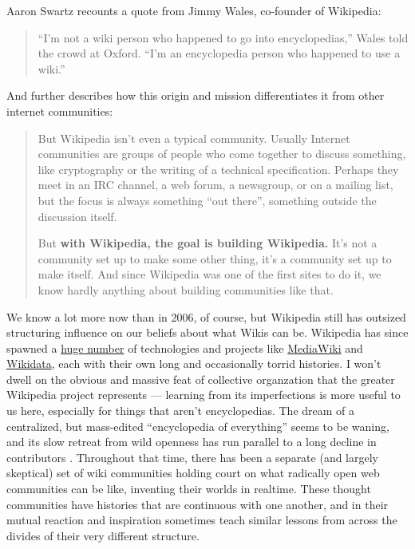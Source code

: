 \documentclass[10pt]{article}
\begin{document}
\begin{multicols}{2}
Aaron Swartz recounts a quote from Jimmy Wales, co-founder of Wikipedia:

\begin{quote}
``I'm not a wiki person who happened to go into encyclopedias,'' Wales
told the crowd at Oxford. ``I'm an encyclopedia person who happened to
use a wiki.'' \cite{swartzWhoWritesWikipedia2006} 
\end{quote}

And further describes how this origin and mission differentiates it from
other internet communities:

\begin{quote}
But Wikipedia isn't even a typical community. Usually Internet
communities are groups of people who come together to discuss something,
like cryptography or the writing of a technical specification. Perhaps
they meet in an IRC channel, a web forum, a newsgroup, or on a mailing
list, but the focus is always something ``out there'', something outside
the discussion itself.

But \textbf{with Wikipedia, the goal is building Wikipedia.} It's not a
community set up to make some other thing, it's a community set up to
make itself. And since Wikipedia was one of the first sites to do it, we
know hardly anything about building communities like that. \cite{swartzMakingMoreWikipedias2006} 
\end{quote}

We know a lot more now than in 2006, of course, but Wikipedia still has
outsized structuring influence on our beliefs about what Wikis can be.
Wikipedia has since spawned a
\href{https://meta.wikimedia.org/wiki/Complete_list_of_Wikimedia_projects}{huge
number} of technologies and projects like
\href{https://meta.wikimedia.org/wiki/MediaWiki}{MediaWiki} and
\href{https://meta.wikimedia.org/wiki/Wikidata}{Wikidata}, each with
their own long and occasionally torrid histories. I won't dwell on the
obvious and massive feat of collective organzation that the greater
Wikipedia project represents --- learning from its imperfections is more
useful to us here, especially for things that aren't encyclopedias. The
dream of a centralized, but mass-edited ``encyclopedia of everything''
seems to be waning, and its slow retreat from wild openness has run
parallel to a long decline in contributors \cite{hillWikipediaEndOpen2019, halfakerRiseDeclineOpen2013} . Throughout
that time, there has been a separate (and largely skeptical) set of wiki
communities holding court on what radically open web communities can be
like, inventing their worlds in realtime. These thought communities have
histories that are continuous with one another, and in their mutual
reaction and inspiration sometimes teach similar lessons from across the
divides of their very different structure.


\end{multicols}
\end{document}
